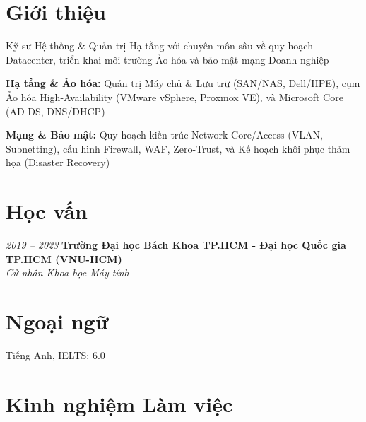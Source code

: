 \section{Giới thiệu}
\begin{onecolentry}
    \begin{highlights}
        \item Kỹ sư Hệ thống \& Quản trị Hạ tầng với chuyên môn sâu về quy hoạch Datacenter, triển khai môi trường Ảo hóa và bảo mật mạng Doanh nghiệp
        \item \textbf{Hạ tầng \& Ảo hóa:} Quản trị Máy chủ \& Lưu trữ (SAN/NAS, Dell/HPE), cụm Ảo hóa High-Availability (VMware vSphere, Proxmox VE), và Microsoft Core (AD DS, DNS/DHCP)
        \item \textbf{Mạng \& Bảo mật:} Quy hoạch kiến trúc Network Core/Access (VLAN, Subnetting), cấu hình Firewall, WAF, Zero-Trust, và Kế hoạch khôi phục thảm họa (Disaster Recovery)
    \end{highlights}
\end{onecolentry}

\section{Học vấn}
\begin{twocolentry}{\textit{2019 -- 2023}}
    \textbf{Trường Đại học Bách Khoa TP.HCM - Đại học Quốc gia TP.HCM (VNU-HCM)}\\[4pt]
    \textit{Cử nhân Khoa học Máy tính}
\end{twocolentry}

\section{Ngoại ngữ}
\begin{onecolentry}
    \begin{highlights}
        \item Tiếng Anh, IELTS: 6.0
    \end{highlights}
\end{onecolentry}

\section{Kinh nghiệm Làm việc}

